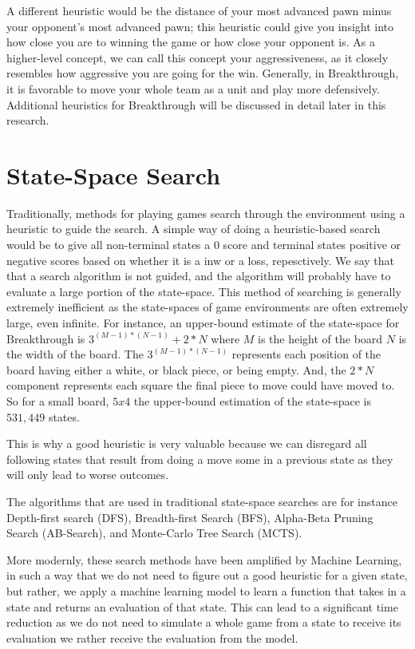 A different heuristic would be the distance of your most advanced pawn minus your opponent's most advanced pawn; this heuristic could give you insight into how close you are to winning the game or how close your opponent is. As a higher-level concept, we can call this concept your aggressiveness, as it closely resembles how aggressive you are going for the win. Generally, in Breakthrough, it is favorable to move your whole team as a unit and play more defensively. Additional heuristics for Breakthrough will be discussed in detail later in this research.

\section{State-Space Search}

Traditionally, methods for playing games search through the environment using a heuristic to guide the search. A simple way of doing a heuristic-based search would be to give all non-terminal states a $0$ score and terminal states positive or negative scores based on whether it is a inw or a loss, repesctively. We say that that a search algorithm is not guided, and the algorithm will probably have to evaluate a large portion of the state-space. This method of searching is generally extremely inefficient as the state-spaces of game environments are often extremely large, even infinite. For instance, an upper-bound estimate of the state-space for Breakthrough is $3^{(M-1)*(N-1)}+2*N$ where $M$ is the height of the board $N$ is the width of the board. The $3^{(M-1)*(N-1)}$ represents each position of the board having either a white, or black piece, or being empty. And, the $2*N$ component represents each square the final piece to move could have moved to. So for a small board, $5x4$ the upper-bound estimation of the state-space is $531,449$ states.

This is why a good heuristic is very valuable because we can disregard all following states that result from doing a move some in a previous state as they will only lead to worse outcomes.

The algorithms that are used in traditional state-space searches are for instance Depth-first search (DFS), Breadth-first Search (BFS), Alpha-Beta Pruning Search (AB-Search)\cite{abpruning:dj}, and Monte-Carlo Tree Search (MCTS).

More modernly, these search methods have been amplified by Machine Learning, in such a way that we do not need to figure out a good heuristic for a given state, but rather, we apply a machine learning model to learn a function that takes in a state and returns an evaluation of that state.\cite{neuralnetworksgames:michulke} This can lead to a significant time reduction as we do not need to simulate a whole game from a state to receive its evaluation we rather receive the evaluation from the model.

